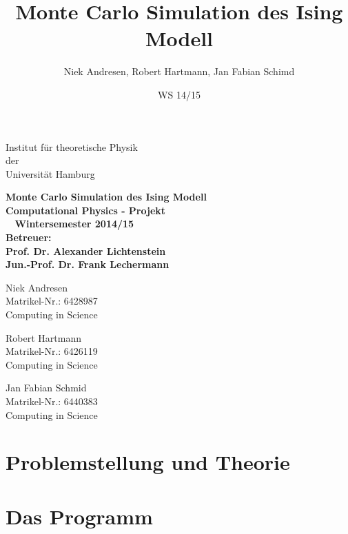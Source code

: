 \documentclass[12pt,a4paper, german]{article}
\title{Monte Carlo Simulation des Ising Modell}
\author{Niek Andresen, Robert Hartmann, Jan Fabian Schimd}
\date{WS 14/15}
\newcommand{\changefont}[3]{
\fontfamily{#1} \fontseries{#2} \fontshape{#3} \selectfont}
\begin{document}
\begin{titlepage}
   

        \begin{center}
            \changefont{cmr}{m}{sc} 
            Institut für theoretische Physik\\
            der\\
            Universität Hamburg\\
            \vspace{5cm}

            \large\bf{Monte Carlo Simulation des Ising Modell}\\
           \vspace{2cm}       
             Computational Physics - Projekt\\\
            \vspace{3cm}
            \large Wintersemester 2014/15\\
	\vspace{2cm}
	Betreuer:\\
	Prof. Dr. Alexander Lichtenstein\\
	Jun.-Prof. Dr. Frank Lechermann\\
	



        \end{center}
\vfill
	\parbox{5cm}{\footnotesize
           Niek Andresen\\
           Matrikel-Nr.: 6428987\\
	Computing in Science}
\hfill
	\parbox{5cm}{\footnotesize
           Robert Hartmann\\
           Matrikel-Nr.: 6426119\\
	Computing in Science}
\hfill
	\parbox{5cm}{\footnotesize
           Jan Fabian Schmid\\
           Matrikel-Nr.: 6440383\\
	Computing in Science}
\end{titlepage}
\maketitle

\tableofcontents
\newpage

\section{Problemstellung und Theorie}

\newpage
\section{Das Programm}

\newpage
\end{document}
